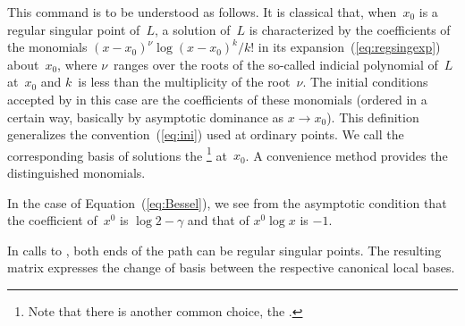 \documentclass[runningheads,a4paper]{llncs}
\begin{document}

{\noindent}This command is to be understood as follows. It is classical
that, when~$x_0$ is a regular singular point of~$L$, a solution of~$L$ is
characterized by the coefficients of the monomials $(x - x_0)^{\nu} \log (x -
x_0)^k / k!$ in its expansion~(\ref{eq:regsingexp}) about~$x_0$, where
$\nu$~ranges over the roots of the so-called indicial polynomial of~$L$
at~$x_0$ and $k$~is less than the multiplicity of the root~$\nu$. The initial
conditions accepted by  in this case are the
coefficients of these monomials (ordered in a certain way, basically by
asymptotic dominance as $x \rightarrow x_0$). This definition generalizes
the convention~(\ref{eq:ini}) used at ordinary points. We call the
corresponding basis of solutions the {}\footnote{Note that there is another common choice, the
{}.} at~$x_0$. A convenience method provides the
distinguished monomials.


{\noindent}In the case of Equation~(\ref{eq:Bessel}), we see from the
asymptotic condition that the coefficient of~$x^0$ is $\log 2 - \gamma$ and
that of $x^0 \log x$ is $- 1$.

In calls to , both ends
of the path can be regular singular points. The resulting matrix expresses the
change of basis between the respective canonical local bases.
\end{document}
